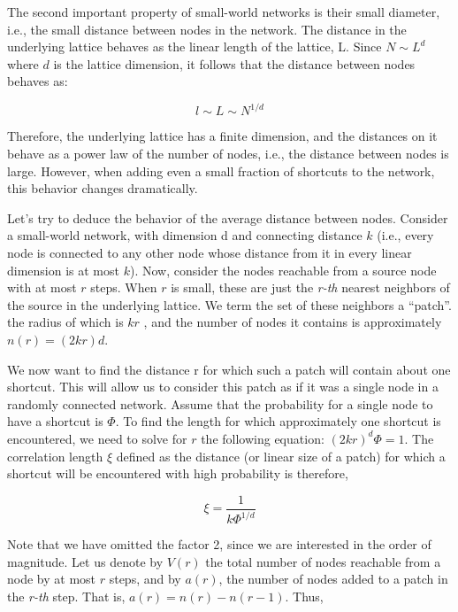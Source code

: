 The second important property of small-world networks is their small diameter, i.e., the small distance between nodes in the network. The distance in the underlying lattice behaves as the linear length of the lattice, L. Since $N \sim L^d$  where $d$ is the lattice dimension, it follows that the distance between nodes behaves as:

\begin{equation}
    l \sim L \sim N^{1/d}
\end{equation}

\nd Therefore, the underlying lattice has a finite dimension, and the distances on it behave as a power law of the number of nodes, i.e., the distance between nodes is large. However, when adding even a small fraction of shortcuts to the network, this behavior changes dramatically. \s

\nd Let's try to deduce the behavior of the average distance between nodes. Consider a small-world network, with dimension d and connecting distance $k$ (i.e., every node is connected to any other node whose distance from it in every linear dimension is at most $k$). Now, consider the nodes reachable from a source node with at most $r$ steps. When $r$ is small, these are just the \emph{r-th} nearest neighbors of the source in the underlying lattice. We term the set of these neighbors a “patch”. the radius of which is $kr$ , and the number of nodes it contains is approximately $n(r) = (2kr)d$. \s

\nd We now want to find the distance r for which such a patch will contain about one shortcut. This will allow us to consider this patch as if it was a single node in a randomly connected network. Assume that the probability for a single node to have a shortcut is $\Phi$. To find the length for which approximately one shortcut is encountered, we need to solve for $r$ the following equation: $(2kr)^d \Phi = 1$. The correlation length $\xi$ defined as the distance (or linear size of a patch) for which a shortcut will be encountered with high probability is therefore,

\begin{equation}
    \xi = \frac{1}{k \Phi^{1/d}}
\end{equation}

\nd Note that we have omitted the factor 2, since we are interested in the order of magnitude. Let us denote by $V(r)$ the total number of nodes reachable from a node by at most $r$ steps, and by $a(r)$, the number of nodes added to a patch in the \emph{r-th} step. That is, $a(r) = n(r) - n(r-1)$. Thus,

